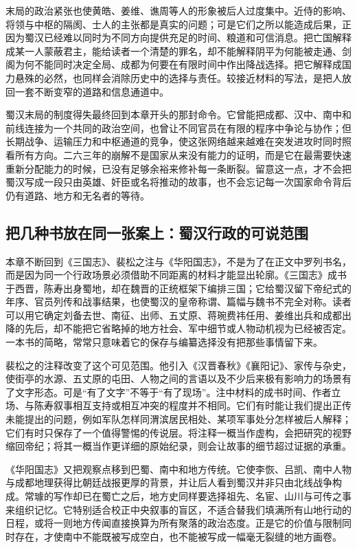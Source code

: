 末局的政治紧张也使黄皓、姜维、谯周等人的形象被后人过度集中。近侍的影响、将领与中枢的隔阂、士人的主张都是真实的问题；可是它们之所以能造成后果，正因为蜀汉已经难以同时为不同方向提供充足的时间、粮道和可信消息。把亡国解释成某一人蒙蔽君主，能给读者一个清楚的罪名，却不能解释阴平为何能被走通、剑阁为何不能同时决定全局、成都为何要在有限时间中作出降战选择。把它解释成国力悬殊的必然，也同样会消除历史中的选择与责任。较接近材料的写法，是把人放回一套不断变窄的道路和信息通道中。

蜀汉末局的制度得失最终回到本章开头的那封命令。它曾能把成都、汉中、南中和前线连接为一个共同的政治空间，也曾让不同官员在有限的程序中争论与协作；但长期战争、运输压力和中枢通道的竞争，使这张网络越来越难在突发进攻时同时照看所有方向。二六三年的崩解不是国家从来没有能力的证明，而是它在最需要快速重新分配能力的时候，已没有足够余裕来修补每一条断裂。留意这一点，才不会把蜀汉写成一段只由英雄、奸臣或名将推动的故事，也不会忘记每一次国家命令背后仍有道路、地方和无名者的等待。
\subsection{把几种书放在同一张案上：蜀汉行政的可说范围}

本章不断回到《三国志》、裴松之注与《华阳国志》，不是为了在正文中罗列书名，而是因为同一个行政场景必须借助不同距离的材料才能显出轮廓。《三国志》成书于西晋，陈寿出身蜀地，却在魏晋的正统框架下编排三国；它给蜀汉留下帝纪式的年序、官员列传和战事结果，也使蜀汉的皇帝称谓、篇幅与魏书不完全对称。读者可以用它确定刘备去世、南征、出师、五丈原、蒋琬费祎任用、姜维出兵和成都出降的先后，却不能把它省略掉的地方社会、军中细节或人物动机视为已经被否定。一本书的简略，常常只意味着它的保存与编纂选择没有把那些事情留下来。

裴松之的注释改变了这个可见范围。他引入《汉晋春秋》《襄阳记》、家传与杂史，使街亭的水源、五丈原的屯田、人物之间的言语以及不少后来极有影响力的场景有了文字形态。可是“有了文字”不等于“有了现场”。注中材料的成书时间、作者立场、与陈寿叙事相互支持或相互冲突的程度并不相同。它们有时能让我们提出正传未能提出的问题，例如军队怎样同渭滨居民相处、某项军事处分怎样被后人解释；它们有时只保存了一个值得警惕的传说层。将注释一概当作虚构，会把研究的视野缩回帝纪；将其一概当作更详细的原始纪录，则会让故事的细节超过证据的承重。

《华阳国志》又把观察点移到巴蜀、南中和地方传统。它使李恢、吕凯、南中人物与成都地理获得比朝廷战报更厚的背景，并让后人看到蜀汉并非只由北线战争构成。常璩的写作却已在蜀亡之后，地方史同样要选择祖先、名宦、山川与可传之事来组织记忆。它特别适合校正中央叙事的盲区，不适合替我们填满所有山地行动的日程，或将一则地方传闻直接换算为所有聚落的政治态度。正是它的价值与限制同时存在，才使南中不能既被写成空白，也不能被写成一幅毫无裂缝的地方画卷。

